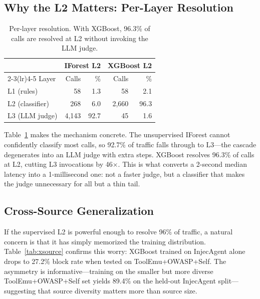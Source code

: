 \documentclass{article}
\begin{document}
\subsection{Why the L2 Matters: Per-Layer Resolution}

\begin{table}[t]
\centering\small
\caption{Per-layer resolution. With XGBoost, 96.3\% of calls are resolved at L2 without invoking the LLM judge.}
\vspace{-0.1in}
\label{tab:perlayer}
\begin{tabular}{lrrrr}
\toprule
 & \multicolumn{2}{c}{IForest L2} & \multicolumn{2}{c}{XGBoost L2} \\
\cmidrule(lr){2-3}\cmidrule(lr){4-5}
Layer & Calls & \% & Calls & \% \\
\midrule
L1 (rules) & 58 & 1.3 & 58 & 2.1 \\
L2 (classifier) & 268 & 6.0 & 2{,}660 & 96.3 \\
L3 (LLM judge) & 4{,}143 & 92.7 & 45 & 1.6 \\
\bottomrule
\end{tabular}
\vspace{-0.1in}
\end{table}

Table~\ref{tab:perlayer} makes the mechanism concrete.
The unsupervised IForest cannot confidently classify most calls, so 92.7\% of traffic falls through to L3---the cascade degenerates into an LLM judge with extra steps.
XGBoost resolves 96.3\% of calls at L2, cutting L3 invocations by 46$\times$.
This is what converts a 2-second median latency into a 1-millisecond one: not a faster judge, but a classifier that makes the judge unnecessary for all but a thin tail.

\subsection{Cross-Source Generalization}

If the supervised L2 is powerful enough to resolve 96\% of traffic, a natural concern is that it has simply memorized the training distribution.
Table~\ref{tab:xsource} confirms this worry: XGBoost trained on InjecAgent alone drops to 27.2\% block rate when tested on ToolEmu+OWASP+Self.
The asymmetry is informative---training on the smaller but more diverse ToolEmu+OWASP+Self set yields 89.4\% on the held-out InjecAgent split---suggesting that source diversity matters more than source size.
\end{document}
